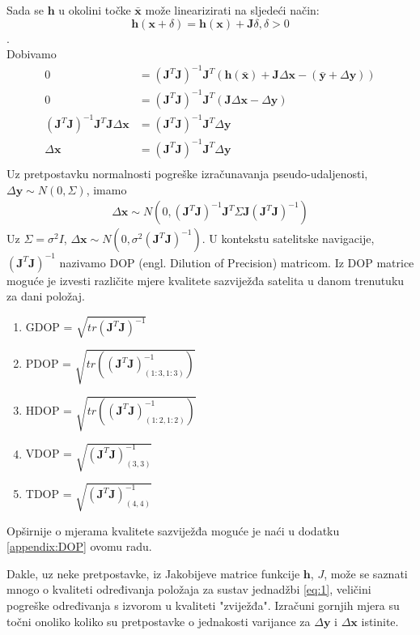\documentclass[a4paper,twoside,12pt]{memoir} %
\begin{document}
Sada se $\mathbf{h}$ u okolini točke $\bar{\mathbf{x}}$ može linearizirati na sljedeći način:
$$\mathbf{h}(\mathbf{x}+\delta) = \mathbf{h}(\mathbf{x}) + \mathbf{J} \delta, \delta > 0$$.\\
Dobivamo
\begin{align*}
0 &= (\mathbf{J}^T\mathbf{J})^{-1}\mathbf{J}^T (\mathbf{h}(\bar{\mathbf{x}}) + \mathbf{J}\Delta \mathbf{x} -(\bar{\mathbf{y}} + \Delta \mathbf{y}))\\
0 &= (\mathbf{J}^T\mathbf{J})^{-1}\mathbf{J}^T (\mathbf{J}\Delta \mathbf{x} - \Delta \mathbf{y})\\
(\mathbf{J}^T\mathbf{J})^{-1}\mathbf{J}^T \mathbf{J}\Delta \mathbf{x}& = (\mathbf{J}^T\mathbf{J})^{-1}\mathbf{J}^T \Delta \mathbf{y}\\
\Delta \mathbf{x} &= (\mathbf{J}^T\mathbf{J})^{-1}\mathbf{J}^T \Delta \mathbf{y}\\
\end{align*}
Uz pretpostavku normalnosti pogreške izračunavanja pseudo-udaljenosti,
\newline $\Delta \mathbf{y} \sim N(0,\Sigma)$, imamo
\begin{align}\label{eq:xerrorDistr}
	\Delta \mathbf{x} \sim N(0,(\mathbf{J}^T\mathbf{J})^{-1}\mathbf{J}^T\Sigma \mathbf{J}(\mathbf{J}^T\mathbf{J})^{-1})
\end{align}
Uz $\Sigma = \sigma^2I$, $\Delta \mathbf{x} \sim N(0,\sigma^2(\mathbf{J}^T\mathbf{J})^{-1})$.
U kontekstu satelitske navigacije, $(\mathbf{J}^T\mathbf{J})^{-1}$ nazivamo DOP (engl. Dilution of Precision) matricom.
Iz DOP matrice moguće je izvesti različite mjere kvalitete sazviježđa satelita u danom trenutuku za dani položaj.
\begin{enumerate}
	\item GDOP = $\sqrt{tr(\mathbf{J}^T\mathbf{J})^{-1}}$
	\item PDOP = $\sqrt{tr((\mathbf{J}^T\mathbf{J})^{-1}_{(1:3,1:3)})}$
	\item HDOP = $\sqrt{tr((\mathbf{J}^T\mathbf{J})^{-1}_{(1:2,1:2)})}$
	\item VDOP = $\sqrt{(\mathbf{J}^T\mathbf{J})^{-1}_{(3,3)}}$
	\item TDOP = $\sqrt{(\mathbf{J}^T\mathbf{J})^{-1}_{(4,4)}}$
\end{enumerate}
Opširnije o mjerama kvalitete sazviježđa moguće je naći u dodatku \ref{appendix:DOP} ovomu radu.

Dakle, uz neke pretpostavke, iz Jakobijeve matrice funkcije $\mathbf{h}$, $J$, može se saznati mnogo o kvaliteti 
određivanja položaja za sustav jednadžbi \ref{eq:1}, veličini pogreške određivanja
s izvorom u kvaliteti "zviježđa".
Izračuni gornjih mjera su točni onoliko koliko su pretpostavke
o jednakosti varijance za $\Delta \mathbf{y}$ i $\Delta \mathbf{x}$
istinite.
\end{document}

